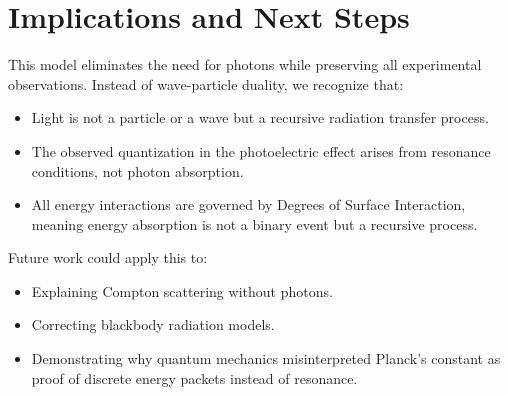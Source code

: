 \documentclass{article}
\begin{document}
\section{Implications and Next Steps}
This model eliminates the need for photons while preserving all experimental observations. Instead of wave-particle duality, we recognize that:
\begin{itemize}
    \item Light is not a particle or a wave but a recursive radiation transfer process.
    \item The observed quantization in the photoelectric effect arises from resonance conditions, not photon absorption.
    \item All energy interactions are governed by Degrees of Surface Interaction, meaning energy absorption is not a binary event but a recursive process.
\end{itemize}

Future work could apply this to:
\begin{itemize}
    \item Explaining Compton scattering without photons.
    \item Correcting blackbody radiation models.
    \item Demonstrating why quantum mechanics misinterpreted Planck’s constant as proof of discrete energy packets instead of resonance.
\end{itemize}
\end{document}
